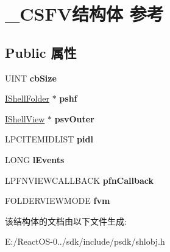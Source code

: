 \hypertarget{struct___c_s_f_v}{}\section{\+\_\+\+C\+S\+F\+V结构体 参考}
\label{struct___c_s_f_v}
\subsection*{Public 属性}
\begin{DoxyCompactItemize}
\item 
\mbox{\label{struct___c_s_f_v_abba09a85f018a932418956280da6c25c}} 
U\+I\+NT {\bfseries cb\+Size}
\item 
\mbox{\label{struct___c_s_f_v_ad958a983cbfa372bb711c389297c31f4}} 
\hyperlink{interface_i_shell_folder}{I\+Shell\+Folder} $\ast$ {\bfseries pshf}
\item 
\mbox{\label{struct___c_s_f_v_a3e6c641a4bd657c4ef39b55e59770413}} 
\hyperlink{interface_i_shell_view}{I\+Shell\+View} $\ast$ {\bfseries psv\+Outer}
\item 
\mbox{\label{struct___c_s_f_v_acc139d73cc821a3970bf689e7b9d8c6c}} 
L\+P\+C\+I\+T\+E\+M\+I\+D\+L\+I\+ST {\bfseries pidl}
\item 
\mbox{\label{struct___c_s_f_v_a6d11f692e19b17285d484b5cc0e545cc}} 
L\+O\+NG {\bfseries l\+Events}
\item 
\mbox{\label{struct___c_s_f_v_a5ecaa1800a4cc2b254b7152ab8c05a6f}} 
L\+P\+F\+N\+V\+I\+E\+W\+C\+A\+L\+L\+B\+A\+CK {\bfseries pfn\+Callback}
\item 
\mbox{\label{struct___c_s_f_v_a02577e5234bba8bc3c84ecd959887335}} 
F\+O\+L\+D\+E\+R\+V\+I\+E\+W\+M\+O\+DE {\bfseries fvm}
\end{DoxyCompactItemize}


该结构体的文档由以下文件生成\+:\begin{DoxyCompactItemize}
\item 
E\+:/\+React\+O\+S-\/0../sdk/include/psdk/shlobj.\+h\end{DoxyCompactItemize}
